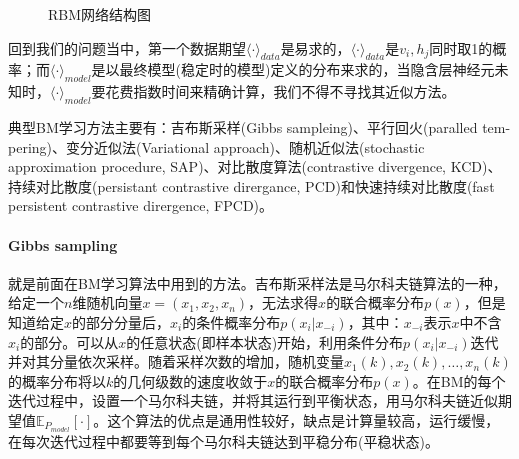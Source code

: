 {\begin{figure}[H]
            \caption{RBM网络结构图}
            \label{fig:RBM网络结构图1}
            \end{figure}
            \par
            回到我们的问题当中，第一个数据期望$\langle\cdot\rangle_{data}$是易求的，$\langle\cdot\rangle_{data}$是$v_i,h_j$同时取1的概率；而$\langle\cdot\rangle_{model}$是以最终模型(稳定时的模型)定义的分布来求的，当隐含层神经元未知时，$\langle\cdot\rangle_{model}$要花费指数时间来精确计算，我们不得不寻找其近似方法。
            \par
            典型BM学习方法主要有：吉布斯采样(Gibbs sampleing)、平行回火(paralled tem-pering)、变分近似法(Variational approach)、随机近似法(stochastic approximation procedure, SAP)、对比散度算法(contrastive divergence, KCD)、持续对比散度(persistant contrastive dirergance, PCD)和快速持续对比散度(fast persistent contrastive dirergence, FPCD)。
            \paragraph{Gibbs sampling}就是前面在BM学习算法中用到的方法。吉布斯采样法是马尔科夫链算法的一种，给定一个$n$维随机向量$x=(x_1,x_2,x_n)$，无法求得$x$的联合概率分布$p(x)$，但是知道给定$x$的部分分量后，$x_i$的条件概率分布$p(x_i|x_{-i})$，其中：$x_{-i}$表示$x$中不含$x_i$的部分。可以从$x$的任意状态(即样本状态)开始，利用条件分布$p(x_i|x_{-i})$迭代并对其分量依次采样。随着采样次数的增加，随机变量$x_1(k),x_2(k),\dots,x_n(k)$的概率分布将以$k$的几何级数的速度收敛于$x$的联合概率分布$p(x)$。在BM的每个迭代过程中，设置一个马尔科夫链，并将其运行到平衡状态，用马尔科夫链近似期望值$\mathbb{E}_{P_{model}}[\cdot]$。这个算法的优点是通用性较好，缺点是计算量较高，运行缓慢，在每次迭代过程中都要等到每个马尔科夫链达到平稳分布(平稳状态)。
}
